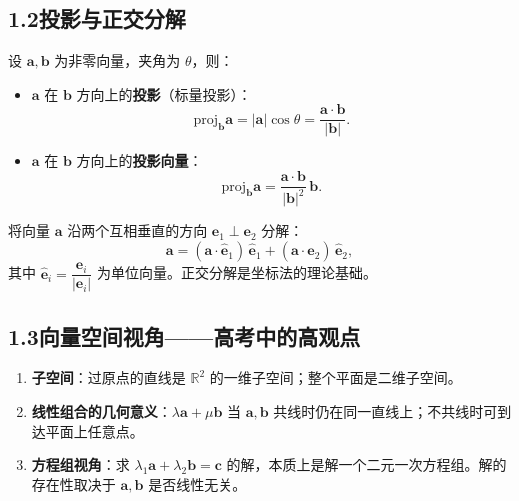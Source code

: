 \documentclass[12pt, a4paper]{ctexart}
\begin{document}
\subsection*{1.2\quad 投影与正交分解}

\begin{knowledgebox}[向量的投影]
设 $\boldsymbol{a},\boldsymbol{b}$ 为非零向量，夹角为 $\theta$，则：
\begin{itemize}[leftmargin=2em]
  \item $\boldsymbol{a}$ 在 $\boldsymbol{b}$ 方向上的\textbf{投影}（标量投影）：
  \[
    \text{proj}_{\boldsymbol{b}}\boldsymbol{a}=|\boldsymbol{a}|\cos\theta=\frac{\boldsymbol{a}\cdot\boldsymbol{b}}{|\boldsymbol{b}|}.
  \]
  \item $\boldsymbol{a}$ 在 $\boldsymbol{b}$ 方向上的\textbf{投影向量}：
  \[
    \text{proj}_{\boldsymbol{b}}\boldsymbol{a}=\frac{\boldsymbol{a}\cdot\boldsymbol{b}}{|\boldsymbol{b}|^2}\,\boldsymbol{b}.
  \]
\end{itemize}
\end{knowledgebox}

\begin{knowledgebox}[正交分解]
将向量 $\boldsymbol{a}$ 沿两个互相垂直的方向 $\boldsymbol{e}_1\perp\boldsymbol{e}_2$ 分解：
\[
  \boldsymbol{a}=(\boldsymbol{a}\cdot\hat{\boldsymbol{e}}_1)\,\hat{\boldsymbol{e}}_1+(\boldsymbol{a}\cdot\hat{\boldsymbol{e}}_2)\,\hat{\boldsymbol{e}}_2,
\]
其中 $\hat{\boldsymbol{e}}_i=\dfrac{\boldsymbol{e}_i}{|\boldsymbol{e}_i|}$ 为单位向量。正交分解是坐标法的理论基础。
\end{knowledgebox}

\subsection*{1.3\quad 向量空间视角——高考中的高观点}

\begin{knowledgebox}[向量空间的核心思想]
\begin{enumerate}[leftmargin=1.5em]
  \item \textbf{子空间}：过原点的直线是 $\mathbb{R}^2$ 的一维子空间；整个平面是二维子空间。
  \item \textbf{线性组合的几何意义}：$\lambda\boldsymbol{a}+\mu\boldsymbol{b}$ 当 $\boldsymbol{a},\boldsymbol{b}$ 共线时仍在同一直线上；不共线时可到达平面上任意点。
  \item \textbf{方程组视角}：求 $\lambda_1\boldsymbol{a}+\lambda_2\boldsymbol{b}=\boldsymbol{c}$ 的解，本质上是解一个二元一次方程组。解的存在性取决于 $\boldsymbol{a},\boldsymbol{b}$ 是否线性无关。
\end{enumerate}
\end{knowledgebox}
\end{document}
